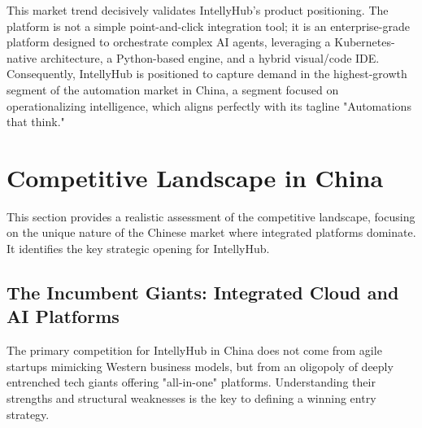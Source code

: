 \documentclass[11pt, a4paper, oneside]{article}
\begin{document}
This market trend decisively validates IntellyHub's product positioning. The platform is not a simple point-and-click integration tool; it is an enterprise-grade platform designed to orchestrate complex AI agents, leveraging a Kubernetes-native architecture, a Python-based engine, and a hybrid visual/code IDE\cite{IntellyHubBP}. Consequently, IntellyHub is positioned to capture demand in the highest-growth segment of the automation market in China, a segment focused on operationalizing intelligence, which aligns perfectly with its tagline "Automations that think."

\begin{table}[H]
\centering
\caption{Summary of Chinese Automation/AI Market Size and CAGR (2025-2030)}
\end{table}
\section{Competitive Landscape in China}
This section provides a realistic assessment of the competitive landscape, focusing on the unique nature of the Chinese market where integrated platforms dominate. It identifies the key strategic opening for IntellyHub.

\subsection{The Incumbent Giants: Integrated Cloud and AI Platforms}
The primary competition for IntellyHub in China does not come from agile startups mimicking Western business models, but from an oligopoly of deeply entrenched tech giants offering "all-in-one" platforms. Understanding their strengths and structural weaknesses is the key to defining a winning entry strategy.
\end{document}
